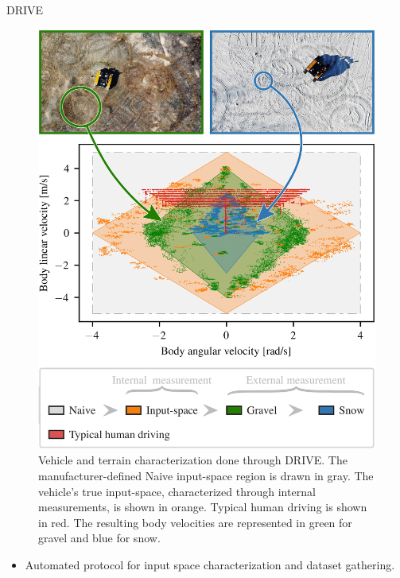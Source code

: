 \documentclass[final,hyperref={pdfpagelabels=false}]{beamer}
\begin{document}
\begin{frame}[t]
\begin{columns}[t]
\begin{column}{.465\textwidth}
\begin{block}{\acf{DRIVE}}
	\begin{figure}
		\includegraphics[width=0.785\linewidth]{figures/Figure_1_final_no_margin.pdf}%
		\captionsetup{width = 0.975\linewidth, justification=justified, name=Figure 1}
		\caption{
			Vehicle and terrain characterization done through DRIVE.
			The manufacturer-defined Naive input-space region is drawn in gray.
			The vehicle's true input-space, characterized through internal measurements, is shown in orange.
			Typical human driving is shown in red.
			The resulting body velocities are represented in green for gravel and blue for snow.
		}
		\label{fig:simu}
	\end{figure}
		\begin{itemize}
		\item Automated protocol for input space characterization and dataset gathering.

\end{itemize}
\end{block}
\end{column}
\end{columns}
\end{frame}
\end{document}
